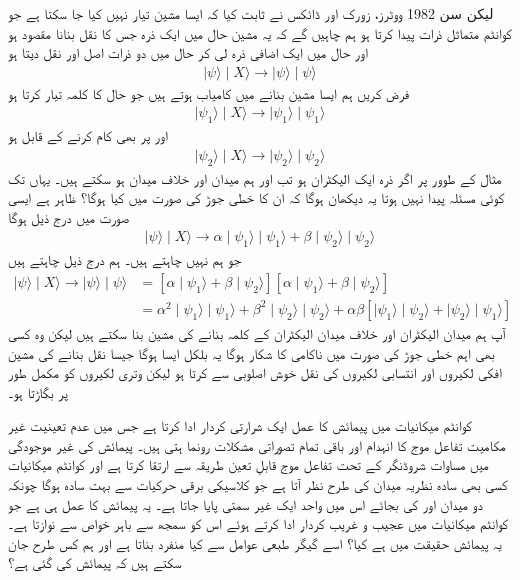 لیکن سن \num{1982} ووٹرز، زورک اور ڈائکس نے ثابت کیا کہ ایسا مشین تیار نہیں کیا جا سکتا ہے جو کوانٹم متماثل ذرات پیدا کرتا ہو ہم چاہیں گے کہ یہ مشین حال  میں ایک ذرہ جس کا نقل بنانا مقصود ہو اور حال  میں ایک اضافی ذرہ لی کر  حال  میں دو ذرات  اصل اور نقل دیتا ہو 
\begin{align}
	\mid\psi\rangle\mid X\rangle\to\mid\psi\rangle\mid\psi\rangle
\end{align}
فرض کریں ہم ایسا مشین بنانے میں کامیاب ہوتے ہیں جو حال  کا کلمہ تیار کرتا ہو 
\begin{align}
	\mid\psi_1\rangle\mid X\rangle\to\mid\psi_1\rangle\mid\psi_1\rangle
\end{align}
اور  پر بھی کام کرنے کے قابل ہو
\begin{align}
	\mid\psi_2\rangle\mid X\rangle\to\mid\psi_2\rangle\mid\psi_2\rangle
\end{align}
مثال کے طوور پر اگر ذرہ ایک الیکٹران ہو تب  اور  ہم میدان اور خلاف میدان ہو سکتے ہیں۔ یہاں تک کوئی مسئلہ پیدا نہیں ہوتا یہ دیکھان ہوگا کہ ان کا خطی جوڑ  کی صورت میں کیا ہوگا؟ ظاہر ہے ایسی صورت میں درج ذیل ہوگا
\begin{align}
	\mid\psi\rangle\mid X\rangle\to\alpha\mid\psi_1\rangle\mid\psi_1\rangle+\beta\mid\psi_2\rangle\mid\psi_2\rangle
\end{align}
جو ہم نہیں چاہتے ہیں۔ ہم درج ذیل چاہتے ہیں  
\begin{align}
	\mid\psi\rangle\mid X\rangle\to\mid\psi\rangle\mid\psi\rangle &= [\alpha\mid\psi_1\rangle+\beta\mid\psi_2\rangle][\alpha\mid\psi_1\rangle+\beta\mid\psi_2\rangle]\nonumber \\
	&= \alpha^2\mid\psi_1\rangle\mid\psi_1\rangle+\beta^2\mid\psi_2\rangle\mid\psi_2\rangle+\alpha\beta[\mid\psi_1\rangle\mid\psi_2\rangle+\mid\psi_2\rangle\mid\psi_1\rangle]
\end{align}
آپ ہم میدان الیکٹران اور خلاف میدان الیکٹران کے کلمہ بنانے کی مشین بنا سکتے ہیں لیکن وہ کسی بھی اہم خطی جوڑ کی صورت میں ناکامی کا شکار ہوگا یہ بلکل ایسا ہوگا جیسا نقل بنانے کی مشین  افکی لکیروں اور انتسابی لکیروں کی نقل خوش اصلوبی سے کرتا ہو لیکن وتری لکیروں کو مکمل طور پر بگاڑتا ہو۔

کوانٹم میکانیات میں پیمائش کا عمل ایک شرارتی کردار ادا کرتا ہے جس میں عدم تعینیت غیر مکامیت تفاعل موج کا انہدام اور باقی تمام تصوراتی مشکلات رونما ہتی ہیں۔ پیمائش کی غیر موجودگی میں مساوات شروڈنگر کے تحت تفاعل موج قابلِ تعین طریقہ سے ارتقا کرتا ہے اور کوانٹم میکانیات کسی بھی سادہ نظریہ میدان کی طرح نظر آتا ہے جو کلاسیکی برقی حرکیات سے بہت سادہ ہوگا چونکہ دو میدان  اور  کی بجائے اس میں واحد ایک غیر سمتی  پایا جاتا ہے۔ یہ پیمائش کا عمل ہی ہے جو کوانٹم میکانیات میں عجیب و غریب کردار ادا کرتے ہوئے اس کو سمجھ سے باہر خواص سے نوازتا ہے۔ یہ پیمائش حقیقت میں ہے کیا؟ اسے گیگر طبعی عوامل سے کیا منفرد بناتا ہے اور ہم کس طرح جان سکتے ہیں کہ پیمائش کی گئی ہے؟

